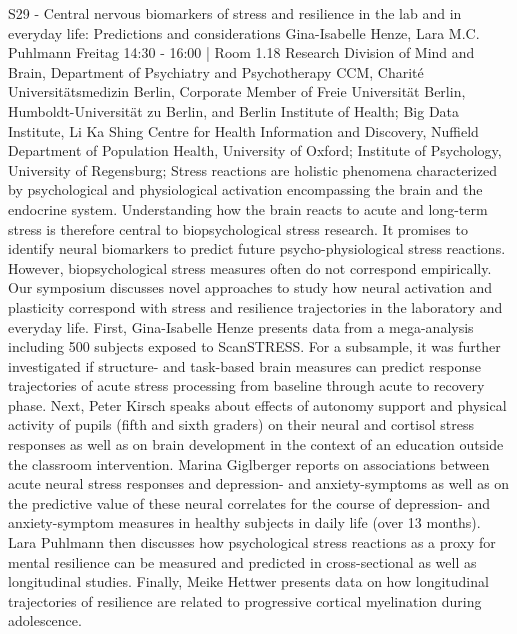 
            \begin{symposium}
            {S29 - Central nervous biomarkers of stress and resilience in the lab and in everyday life: Predictions and considerations }
            {Gina-Isabelle Henze, Lara M.C. Puhlmann}
            {Freitag 14:30 - 16:00 | Room 1.18}
            {Research Division of Mind and Brain, Department of Psychiatry and Psychotherapy CCM, Charité Universitätsmedizin Berlin, Corporate Member of Freie Universität Berlin, Humboldt-Universität zu Berlin, and Berlin Institute of Health; Big Data Institute, Li Ka Shing Centre for Health Information and Discovery, Nuffield Department of Population Health, University of Oxford; Institute of Psychology, University of Regensburg;}
            Stress reactions are holistic phenomena characterized by psychological and physiological activation encompassing the brain and the endocrine system. Understanding how the brain reacts to acute and long-term stress is therefore central to biopsychological stress research. It promises to identify neural biomarkers to predict future psycho-physiological stress reactions. However, biopsychological stress measures often do not correspond empirically. Our symposium discusses novel approaches to study how neural activation and plasticity correspond with stress and resilience trajectories in the laboratory and everyday life.
First, Gina-Isabelle Henze presents data from a mega-analysis including 500 subjects exposed to ScanSTRESS. For a subsample, it was further investigated if structure- and task-based brain measures can predict response trajectories of acute stress processing from baseline through acute to recovery phase.
Next, Peter Kirsch speaks about effects of autonomy support and physical activity of pupils (fifth and sixth graders) on their neural and cortisol stress responses as well as on brain development in the context of an education outside the classroom intervention.
Marina Giglberger reports on associations between acute neural stress responses and depression- and anxiety-symptoms as well as on the predictive value of these neural correlates for the course of depression- and anxiety-symptom measures in healthy subjects in daily life (over 13 months).
Lara Puhlmann then discusses how psychological stress reactions as a proxy for mental resilience can be measured and predicted in cross-sectional as well as longitudinal studies.
Finally, Meike Hettwer presents data on how longitudinal trajectories of resilience are related to progressive cortical myelination during adolescence.
            \begin{description}    
            

\end{description}
\end{symposium}
